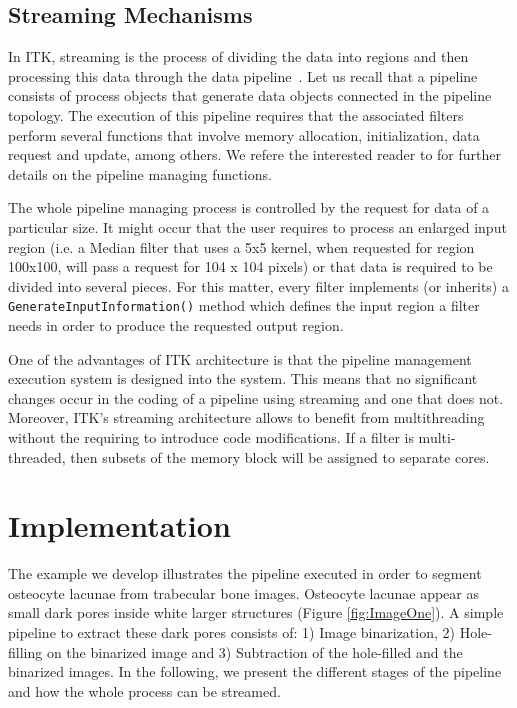 \documentclass{InsightArticle}
\begin{document}
\subsection{Streaming Mechanisms}

In ITK, streaming is the process of dividing the data into regions and then
processing this data through the data pipeline~\cite{Ibanez2005}. Let us recall
that a pipeline consists of process objects that generate data objects connected
in the pipeline topology. The execution of this pipeline requires that the
associated filters perform several functions that involve memory allocation,
initialization, data request and update, among others. We refere the interested
reader to \cite{Ibanez2005} for further details on the pipeline managing
functions.


The whole pipeline managing process is controlled by the request for data of
a particular size. It might occur that the user requires to process an enlarged
input region (i.e. a Median filter that uses a 5x5 kernel, when requested for
region 100x100, will pass a request for 104 x 104 pixels) or that data is required
to be divided into several pieces. For this matter, every filter implements (or
inherits) a \verb+GenerateInputInformation()+ method which defines the input
region a filter needs in order to produce the requested output region.

One of the advantages of ITK architecture is that the pipeline management execution
system is designed into the system. This means that no significant changes occur
in the coding of a pipeline using streaming and one that does not. Moreover, ITK's
streaming architecture allows to benefit from multithreading without the requiring
to introduce code modifications. If a filter is multi-threaded, then subsets
of the memory block will be assigned to separate cores.

\section{Implementation}
\label{sec:implementation}
The example we develop illustrates the pipeline executed in order to segment
osteocyte lacunae from trabecular bone images. Osteocyte lacunae appear as small
dark pores inside white larger structures (Figure \ref{fig:ImageOne}). A simple pipeline
to extract these dark pores consists of: 1) Image binarization, 2)
Hole-filling on the binarized image and 3) Subtraction of the hole-filled and
the binarized images.  In the following, we present the different stages of the
pipeline and how the whole process can be streamed.
\end{document}
